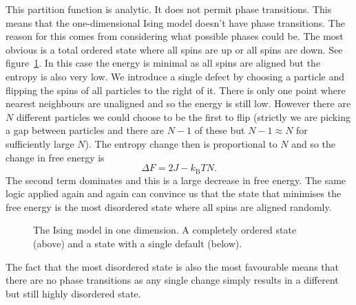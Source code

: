\documentclass[a4paper]{article}
\newcommand{\boltzmann}{k_\mathrm{B}}
\begin{document}
    This partition function is analytic.
    It does not permit phase transitions.
    This means that the one-dimensional Ising model doesn't have phase transitions.
    The reason for this comes from considering what possible phases could be.
    The most obvious is a total ordered state where all spins are up or all spins are down.
    See figure~\ref{fig:ising model ordered and one defect}.
    In this case the energy is minimal as all spins are aligned but the entropy is also very low.
    We introduce a single defect by choosing a particle and flipping the spins of all particles to the right of it.
    There is only one point where nearest neighbours are unaligned and so the energy is still low.
    However there are \(N\) different particles we could choose to be the first to flip (strictly we are picking a gap between particles and there are \(N - 1\) of these but \(N - 1 \approx N\) for sufficiently large \(N\)).
    The entropy change then is proportional to \(N\) and so the change in free energy is
    \[\Delta F = 2J - \boltzmann TN.\]
    The second term dominates and this is a large decrease in free energy.
    The same logic applied again and again can convince us that the state that minimises the free energy is the most disordered state where all spins are aligned randomly.
    \begin{figure}
        \centering
        \caption{The Ising model in one dimension. A completely ordered state (above) and a state with a single default (below).}
        \label{fig:ising model ordered and one defect}
    \end{figure}
    The fact that the most disordered state is also the most favourable means that there are no phase transitions as any single change simply results in a different but still highly disordered state.
    
\end{document}
